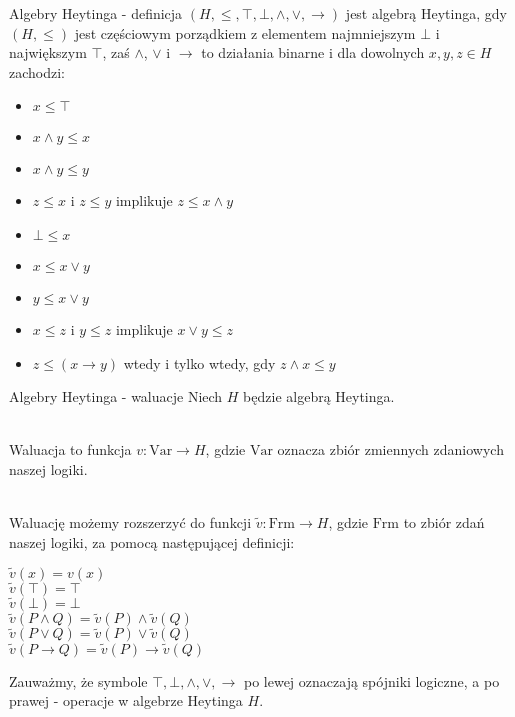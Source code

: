 \documentclass{beamer}
\newcommand{\impl}{\rightarrow}
\begin{document}
\begin{frame}{Algebry Heytinga - definicja}
$(H, \leq, \top, \bot, \land, \lor, \impl)$ jest algebrą Heytinga, gdy $(H, \leq)$ jest częściowym porządkiem z elementem najmniejszym $\bot$ i największym $\top$, zaś $\land$, $\lor$ i $\impl$ to działania binarne i dla dowolnych $x, y, z \in H$ zachodzi: \\
\begin{itemize}
	\item $x \leq \top$
	\item $x \land y \leq x$
	\item $x \land y \leq y$
	\item $z \leq x$ i $z \leq y$ implikuje $z \leq x \land y$
	\item $\bot \leq x$
	\item $x \leq x \lor y$
	\item $y \leq x \lor y$
	\item $x \leq z$ i $y \leq z$ implikuje $x \lor y \leq z$
	\item $z \leq (x \impl y)$ wtedy i tylko wtedy, gdy $z \land x \leq y$
\end{itemize}
\end{frame}

\begin{frame}{Algebry Heytinga - waluacje}
Niech $H$ będzie algebrą Heytinga. \\~\

Waluacja to funkcja $v : \text{Var} \to H$, gdzie $\text{Var}$ oznacza zbiór zmiennych zdaniowych naszej logiki. \\~\

Waluację możemy rozszerzyć do funkcji $\tilde{v}: \text{Frm} \to H$, gdzie $\text{Frm}$ to zbiór zdań naszej logiki, za pomocą następującej definicji: \\
\begin{center}
  $\tilde{v}(x) = v(x)$ \\
  $\tilde{v}(\top) = \top$ \\
  $\tilde{v}(\bot) = \bot$ \\
  $\tilde{v}(P \land Q) = \tilde{v}(P) \land \tilde{v}(Q)$ \\
  $\tilde{v}(P \lor Q) = \tilde{v}(P) \lor \tilde{v}(Q)$ \\
  $\tilde{v}(P \impl Q) = \tilde{v}(P) \impl \tilde{v}(Q)$ \\
\end{center}

Zauważmy, że symbole $\top, \bot, \land, \lor, \impl$ po lewej oznaczają spójniki logiczne, a po prawej - operacje w algebrze Heytinga $H$.
\end{frame}
\end{document}
